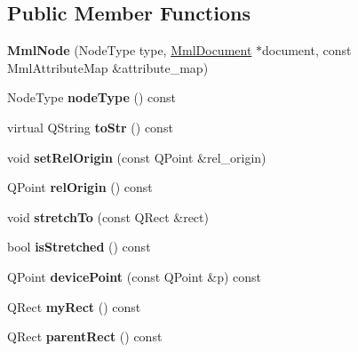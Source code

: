 \subsection*{Public Member Functions}
\begin{DoxyCompactItemize}
\item 
\mbox{\label{class_mml_node_a8de1057b88dc5fbc81a7cc2e9b777662}} 
{\bfseries Mml\+Node} (Node\+Type type, \mbox{\hyperlink{class_mml_document}{Mml\+Document}} $\ast$document, const Mml\+Attribute\+Map \&attribute\+\_\+map)
\item 
\mbox{\label{class_mml_node_a1533b844bfb041ca306154ea8f5157eb}} 
Node\+Type {\bfseries node\+Type} () const
\item 
\mbox{\label{class_mml_node_ae445cc74a1301464b553d64d15e9c47e}} 
virtual Q\+String {\bfseries to\+Str} () const
\item 
\mbox{\label{class_mml_node_ac2e3cbc8f26e0f8b700b2171cd23f8cd}} 
void {\bfseries set\+Rel\+Origin} (const Q\+Point \&rel\+\_\+origin)
\item 
\mbox{\label{class_mml_node_ac986bce71579e2a057adb11e4e6ea020}} 
Q\+Point {\bfseries rel\+Origin} () const
\item 
\mbox{\label{class_mml_node_ab7fb0daec410e3423bf6ffa697d9173d}} 
void {\bfseries stretch\+To} (const Q\+Rect \&rect)
\item 
\mbox{\label{class_mml_node_ac990013082b43ab22285b639bdeb5ee3}} 
bool {\bfseries is\+Stretched} () const
\item 
\mbox{\label{class_mml_node_a7fc9e221d01a714008362cc745a6a4e3}} 
Q\+Point {\bfseries device\+Point} (const Q\+Point \&p) const
\item 
\mbox{\label{class_mml_node_a927d5b4d832a60ba40878721b3602147}} 
Q\+Rect {\bfseries my\+Rect} () const
\item 
\mbox{\label{class_mml_node_a5aad76f3445de4f00ec28f51c681c579}} 
Q\+Rect {\bfseries parent\+Rect} () const
\item 

\end{DoxyCompactItemize}
